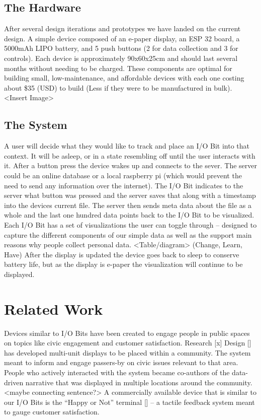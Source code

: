 \documentclass[sigchi-a, authorversion]{acmart}
\begin{document}
\subsection{The Hardware}
After several design iterations and prototypes we have landed on the current design. A simple device composed of an e-paper display, an ESP 32 board, a 5000mAh LIPO battery, and 5 push buttons (2 for data collection and 3 for controls). Each device is approximately 90x60x25cm and should last several months without needing to be charged. These components are optimal for building small, low-maintenance, and affordable devices with each one costing about \$35 (USD) to build (Less if they were to be manufactured in bulk).  <Insert Image>

\subsection{The System}
A user will decide what they would like to track and place an I/O Bit into that context. It will be asleep, or in a state resembling off until the user interacts with it. After a button press the device wakes up and connects to the sever. The server could be an online database or a local raspberry pi (which would prevent the need to send any information over the internet).  The I/O Bit indicates to the server what button was pressed and the server saves that along with a timestamp into the devices current file. The server then sends meta data about the file as a whole and the last one hundred data points back to the I/O Bit to be visualized. Each I/O Bit has a set of visualizations the user can toggle through – designed to capture the different components of our simple data as well as the support main reasons why people collect personal data. <Table/diagram> (Change, Learn, Have) After the display is updated the device goes back to sleep to conserve battery life, but as the display is e-paper the visualization will continue to be displayed.

\section{Related Work}
Devices similar to I/O Bits have been created to engage people in public spaces on topics like civic engagement and customer satisfaction. Research [x] Design [] has developed multi-unit displays to be placed within a community. The system meant to inform and engage passers-by on civic issues relevant to that area. People who actively interacted with the system became co-authors of the data-driven narrative that was displayed in multiple locations around the community. <maybe connecting sentence?> A commercially available device that is similar to our I/O Bits is the “Happy or Not” terminal [] – a tactile feedback system meant to gauge customer satisfaction. 
\end{document}
